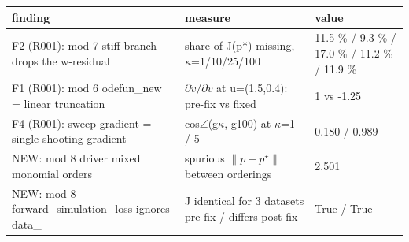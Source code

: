 \begin{tabular}{p{} p{} p{}}
\toprule
finding & measure & value \\
\midrule
F2 (R001): mod 7 stiff branch drops the w-residual & share of J(p*) missing, $\kappa$=1/10/25/100 & 11.5 \% / 9.3 \% / 17.0 \% / 11.2 \% / 11.9 \% \\
F1 (R001): mod 6 odefun\_new = linear truncation & $\partial\dot v/\partial v$ at u=(1.5,0.4): pre-fix vs fixed & 1 vs -1.25 \\
F4 (R001): sweep gradient = single-shooting gradient & cos$\angle$(g$\kappa$, g100) at $\kappa$=1 / 5 & 0.180 / 0.989 \\
NEW: mod 8 driver mixed monomial orders & spurious $\|p-p^\star\|$ between orderings & 2.501 \\
NEW: mod 8 forward\_simulation\_loss ignores data\_ & J identical for 3 datasets pre-fix / differs post-fix & True / True \\
\bottomrule
\end{tabular}
